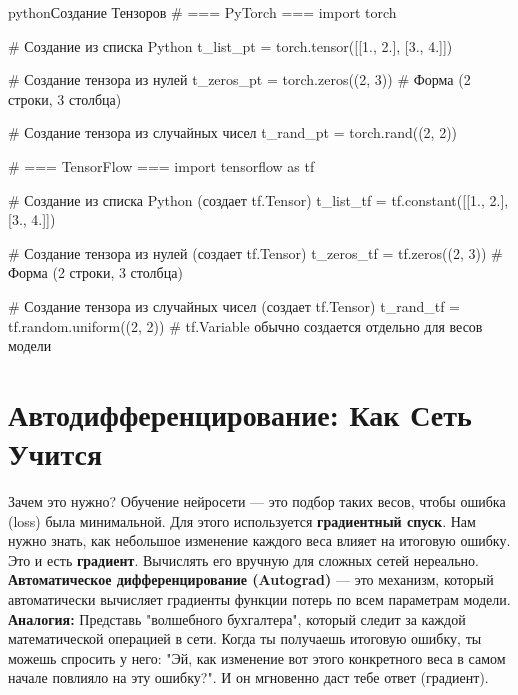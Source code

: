 \begin{codebox}{python}{Создание Тензоров}
# === PyTorch ===
import torch

# Создание из списка Python
t_list_pt = torch.tensor([[1., 2.], [3., 4.]])

# Создание тензора из нулей
t_zeros_pt = torch.zeros((2, 3)) # Форма (2 строки, 3 столбца)

# Создание тензора из случайных чисел
t_rand_pt = torch.rand((2, 2))

# === TensorFlow ===
import tensorflow as tf

# Создание из списка Python (создает tf.Tensor)
t_list_tf = tf.constant([[1., 2.], [3., 4.]])

# Создание тензора из нулей (создает tf.Tensor)
t_zeros_tf = tf.zeros((2, 3)) # Форма (2 строки, 3 столбца)

# Создание тензора из случайных чисел (создает tf.Tensor)
t_rand_tf = tf.random.uniform((2, 2))
# tf.Variable обычно создается отдельно для весов модели
\end{codebox}


\section{Автодифференцирование: Как Сеть Учится}

\begin{myblock}{Зачем это нужно?}
    Обучение нейросети — это подбор таких весов, чтобы ошибка (loss) была минимальной. Для этого используется \textbf{градиентный спуск}. Нам нужно знать, как небольшое изменение каждого веса влияет на итоговую ошибку. Это и есть \textbf{градиент}. Вычислять его вручную для сложных сетей нереально.
    \textbf{Автоматическое дифференцирование (Autograd)} — это механизм, который автоматически вычисляет градиенты функции потерь по всем параметрам модели.
    \textbf{Аналогия:} Представь "волшебного бухгалтера", который следит за каждой математической операцией в сети. Когда ты получаешь итоговую ошибку, ты можешь спросить у него: "Эй, как изменение вот этого конкретного веса в самом начале повлияло на эту ошибку?". И он мгновенно даст тебе ответ (градиент).
\end{myblock}

